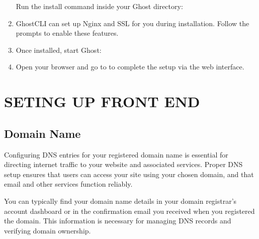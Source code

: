 \documentclass[letterpaper,10pt,english]{sphinxmanual}
\begin{document}
\begin{enumerate}
\sphinxAtStartPar
Run the install command inside your Ghost directory:

\sphinxAtStartPar
{}

\item {} 
\sphinxAtStartPar
{}

\sphinxAtStartPar
Ghost\sphinxhyphen{}CLI can set up Nginx and SSL for you during installation. Follow the prompts to enable these features.

\item {} 
\sphinxAtStartPar
{}

\sphinxAtStartPar
Once installed, start Ghost:

\sphinxAtStartPar
{}

\item {} 
\sphinxAtStartPar
{}

\sphinxAtStartPar
Open your browser and go to  to complete the setup via the web interface.

\end{enumerate}

\sphinxstepscope


\chapter{SETING UP FRONT END}
\label{\detokenize{setup_frontend:seting-up-front-end}}\label{\detokenize{setup_frontend::doc}}

\section{Domain Name}
\label{\detokenize{setup_frontend:domain-name}}
\noindent{}

\sphinxAtStartPar
Configuring DNS entries for your registered domain name is essential for directing internet traffic to your website and associated services. Proper DNS setup ensures that users can access your site using your chosen domain, and that email and other services function reliably.

\sphinxAtStartPar
You can typically find your domain name details in your domain registrar’s account dashboard or in the confirmation email you received when you registered the domain. This information is necessary for managing DNS records and verifying domain ownership.
\end{document}
